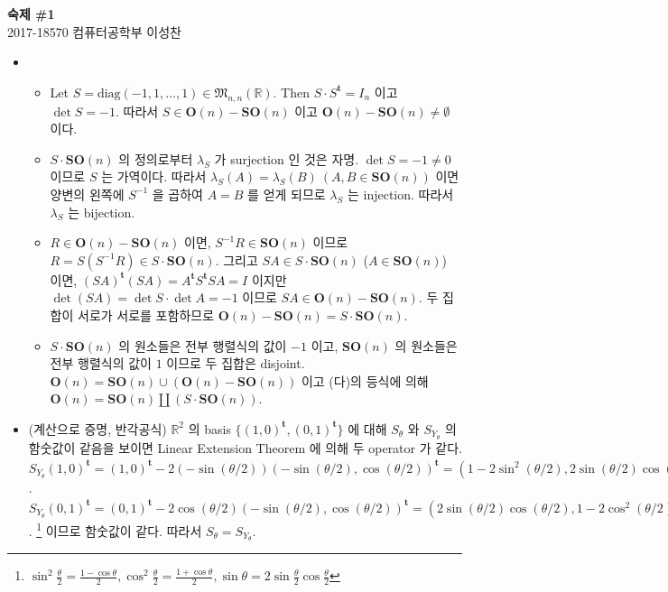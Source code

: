 \documentclass[12pt]{report}
\newcommand{\numl}[1]{\item[\large\textbf{#1}]}
\newcommand{\num}[1]{\item[\textbf{#1}]}
\newcommand{\mf}[1]{\mathfrak{#1}}
\newcommand{\mbb}[1]{\mathbb{#1}}
\newcommand{\rmbf}[1]{\mathrm{\mathbf{#1}}}
\newcommand{\trans}{^{\mathrm{\mathbf{t}}}}
\begin{document}
\begin{center}
\textbf{ 숙제 \#1}\\
\large 2017-18570 컴퓨터공학부 이성찬
\end{center}

\begin{itemize}
\numl{9.3.11}
	\begin{itemize}
		\num{(가)} Let $S = \text{diag}(-1, 1, \dots, 1) \in \mf{M}_{n, n}(\mbb{R})$. Then $S\cdot S\trans = I_n$ 이고 $\det S = -1$. 따라서 $S \in \rmbf{O}(n) - \rmbf{SO}(n)$ 이고 $\rmbf{O}(n) - \rmbf{SO}(n) \neq \emptyset$ 이다.
		\num{(나)} $S\cdot \rmbf{SO}(n)$ 의 정의로부터 $\lambda_S$ 가 surjection 인 것은 자명. $\det S = -1 \neq 0$ 이므로 $S$ 는 가역이다. 따라서 $\lambda_S(A) = \lambda_S(B) \: (A, B\in \rmbf{SO}(n))$ 이면 양변의 왼쪽에 $S^{-1}$ 을 곱하여 $A=B$ 를 얻게 되므로 $\lambda_S$ 는 injection. 따라서 $\lambda_S$ 는 bijection.
		\num{(다)} $R\in \rmbf{O}(n) - \rmbf{SO}(n)$ 이면, $S^{-1}R \in \rmbf{SO}(n)$ 이므로 $R = S(S^{-1}R) \in S\cdot\rmbf{SO}(n)$. 그리고 $SA \in S\cdot \rmbf{SO}(n)$ ($A\in \rmbf{SO}(n)$) 이면,   $(SA)\trans(SA) = A\trans S\trans SA = I$ 이지만 $\det(SA) = \det S\cdot \det A = -1$ 이므로 $SA \in \rmbf{O}(n) - \rmbf{SO}(n)$. 두 집합이 서로가 서로를 포함하므로 $\rmbf{O}(n) - \rmbf{SO}(n) = S\cdot \rmbf{SO}(n)$.
		\num{(라)} $S\cdot \rmbf{SO}(n)$ 의 원소들은 전부 행렬식의 값이 $-1$ 이고, $\rmbf{SO}(n)$ 의 원소들은 전부 행렬식의 값이 $1$ 이므로 두 집합은 disjoint. $\rmbf{O}(n) = \rmbf{SO}(n) \cup (\rmbf{O}(n) - \rmbf{SO}(n))$ 이고 (다)의 등식에 의해 $\rmbf{O}(n) = \rmbf{SO}(n) \amalg (S\cdot \rmbf{SO}(n))$.
	\end{itemize}

\numl{9.5.6} (계산으로 증명, 반각공식) $\mbb{R}^2$ 의 basis $\{(1, 0)\trans, (0, 1)\trans\}$ 에 대해 $S_\theta$ 와 $S_{Y_\theta}$ 의 함숫값이 같음을 보이면 Linear Extension Theorem 에 의해 두 operator 가 같다. $S_{Y_\theta}(1, 0)\trans = (1, 0)\trans - 2(-\sin(\theta/2))(-\sin(\theta/2), \cos(\theta/2))\trans = (1 - 2\sin^2(\theta/2), 2\sin(\theta/2)\cos(\theta/2))\trans = (\cos\theta, \sin\theta)\trans$. $S_{Y_\theta}(0, 1)\trans = (0, 1)\trans - 2\cos(\theta/2)(-\sin(\theta/2), \cos(\theta/2))\trans = (2\sin(\theta/2)\cos(\theta/2), 1-2\cos^2(\theta/2))\trans = (\sin\theta, -\cos\theta)\trans$. \footnote{$\sin^2\frac{\theta}{2} = \frac{1-\cos\theta}{2}, \cos^2\frac{\theta}{2} = \frac{1+\cos\theta}{2}, \sin\theta = 2\sin\frac{\theta}{2}\cos\frac{\theta}{2}$} 이므로 함숫값이 같다. 따라서 $S_\theta = S_{Y_\theta}$.


\end{itemize}
\end{document}
